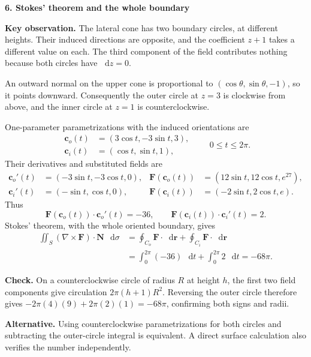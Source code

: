 \documentclass[11pt,letterpaper]{article}
\newcommand{\curl}{\nabla\times}
\renewcommand{\vec}[1]{\mathbf{#1}}
\newcommand{\dd}{\mathop{}\!\mathrm{d}}
\newcommand{\solutionproblem}[3]{%
  \par\bigskip\Needspace{7\baselineskip}
  \noindent\textbf{#1. #2}\par\nobreak
}
\newcommand{\insight}[1]{\par\textbf{Key observation.} #1\par}
\newcommand{\verification}[1]{\par\textbf{Check.} #1\par}
\newcommand{\alternative}[1]{\par\textbf{Alternative.} #1\par}
\begin{document}
\solutionproblem{6}{Stokes' theorem and the whole boundary}{20}
\insight{The lateral cone has two boundary circles, at different heights.
Their induced directions are opposite, and the coefficient $z+1$ takes
a different value on each. The third component of the field contributes
nothing because both circles have $\dd z=0$.}
An outward normal on the upper cone is proportional to
$(\cos\theta,\sin\theta,-1)$, so it points downward. Consequently the
outer circle at $z=3$ is clockwise from above, and the inner circle at
$z=1$ is counterclockwise.

One-parameter parametrizations with the induced orientations are
\[
\begin{aligned}
\vec c_o(t)&=(3\cos t,-3\sin t,3),\\
\vec c_i(t)&=(\cos t,\sin t,1),
\end{aligned}
\qquad0\le t\le2\pi.
\]
Their derivatives and substituted fields are
\[
\begin{aligned}
\vec c_o'(t)&=(-3\sin t,-3\cos t,0),&
\vec F(\vec c_o(t))&=(12\sin t,12\cos t,e^{27}),\\
\vec c_i'(t)&=(-\sin t,\cos t,0),&
\vec F(\vec c_i(t))&=(-2\sin t,2\cos t,e).
\end{aligned}
\]
Thus
\[
\vec F(\vec c_o(t))\cdot\vec c_o'(t)=-36,\qquad
\vec F(\vec c_i(t))\cdot\vec c_i'(t)=2.
\]
Stokes' theorem, with the whole oriented boundary, gives
\[
\begin{aligned}
\iint_S(\curl\vec F)\cdot\vec N\,\dd\sigma
&=\oint_{C_o}\vec F\cdot\dd\vec r
 +\oint_{C_i}\vec F\cdot\dd\vec r\\
&=\int_0^{2\pi}(-36)\,\dd t
 +\int_0^{2\pi}2\,\dd t
=\boxed{-68\pi}.
\end{aligned}
\]
\verification{On a counterclockwise circle of radius $R$ at height $h$,
the first two field components give circulation
$2\pi(h+1)R^2$. Reversing the outer circle therefore gives
$-2\pi(4)(9)+2\pi(2)(1)=-68\pi$, confirming both signs and radii.}
\alternative{Using counterclockwise parametrizations for both circles
and subtracting the outer-circle integral is equivalent. A direct
surface calculation also verifies the number independently.}
\end{document}
